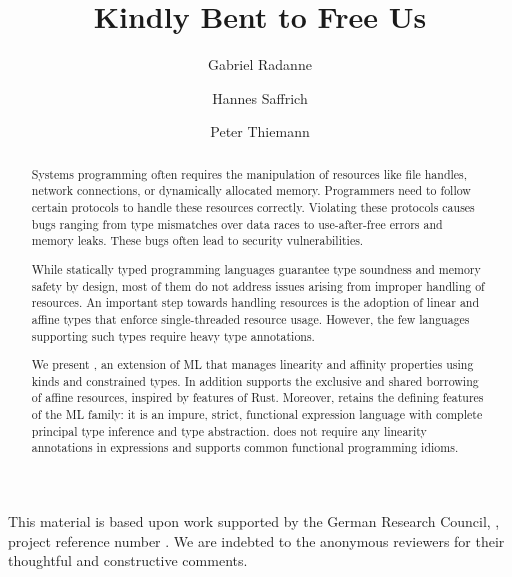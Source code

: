 \documentclass[acmsmall,screen]{acmart}
\author{Gabriel Radanne}
\affiliation{
  \institution{Inria}
  \country{Paris}
}
\author{Hannes Saffrich}
\affiliation{
  \institution{University of Freiburg}
  \country{Germany}
}
\author{Peter Thiemann}
\affiliation{
  \institution{University of Freiburg}
  \country{Germany}
}
\begin{document}
\title{Kindly Bent to Free Us}
\begin{abstract}
  Systems programming often requires the manipulation of resources like
  file handles, network connections, or dynamically allocated
  memory. Programmers need to follow certain protocols to handle
  these resources correctly. Violating these protocols causes bugs
  ranging from type mismatches over data races to use-after-free
  errors and memory leaks. These bugs often lead to security  vulnerabilities.

  While statically typed programming languages guarantee type soundness and memory
  safety by design, most of them do not address issues arising
  from improper handling of resources.
  An important step towards handling resources is the adoption of 
  linear and affine types that enforce single-threaded resource usage.
  However, the few languages supporting such types require heavy type
  annotations. 

  We present \lang, an extension of ML that
  manages linearity and affinity properties using kinds and
  constrained types. In addition
  \lang{} supports the exclusive and shared borrowing of affine
  resources, inspired by features of Rust.
  Moreover, \lang{} retains the defining features of the ML family:
  it is an impure, strict, functional expression language with complete principal type
  inference and type abstraction.
  \lang{} does not require any linearity annotations in
  expressions and supports common functional programming idioms.
\end{abstract}


\maketitle











\begin{acks}
  This material is based upon work supported by the German Research
  Council, , project reference number
  . We are indebted to the anonymous reviewers
  for their thoughtful and constructive comments.
\end{acks}


\end{document}
